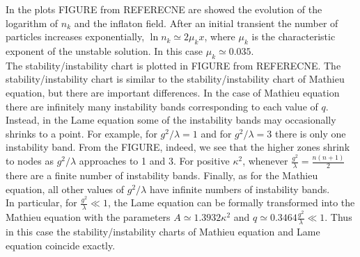 \documentclass[11pt,a4paper,twoside]{book}
\begin{document}
In the plots FIGURE from REFERECNE are showed the evolution of the logarithm of $ n_{k} $ and the inflaton field. After an initial transient the number of particles increases exponentially, $ \ln n_{k} \simeq 2\mu_{k} x $, where $\mu_{k}$ is the characteristic exponent of the unstable solution. In this case $ \mu_{k} \simeq 0.035 $.\\
The stability/instability chart is plotted in FIGURE from REFERECNE. The stability/instability chart is similar to the stability/instability chart of Mathieu equation, but there are important differences. In the case of Mathieu equation there are infinitely many instability bands corresponding to each value of $ q $. Instead, in the Lame equation some of the instability bands may occasionally shrinks to a point. For example, for $ g^{2}/\lambda=1 $ and for $ g^{2}/\lambda=3 $ there is only one instability band. From the FIGURE, indeed, we see that the higher zones shrink to nodes as $ g^{2}/\lambda  $ approaches to 1 and 3. For positive $\kappa^{2}$, whenever $ \frac{g^{2}}{\lambda}=\frac{n(n+1)}{2} $ there are a finite number of instability bands. Finally, as for the Mathieu equation, all other values of $ g^{2}/\lambda $ have infinite numbers of instability bands. \\
In particular, for $\frac{g^{2}}{\lambda} \ll 1  $, the Lame equation can be formally transformed into the Mathieu equation with the parameters $ A\simeq 1.3932 \kappa^{2} $ and $ q\simeq 0.3464 \frac{g^{2}}{\lambda} \ll 1 $. Thus in this case the stability/instability charts of Mathieu equation and Lame equation coincide exactly.
\end{document}
